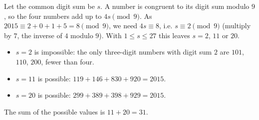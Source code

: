Let the common digit sum be $s$. A number is congruent to its digit sum modulo $9$, so the four numbers add up to $4s\pmod9$. As $2015\equiv2+0+1+5=8\pmod9$, we need $4s\equiv8$, i.e. $s\equiv2\pmod9$ (multiply by $7$, the inverse of $4$ modulo $9$). With $1\le s\le27$ this leaves $s=2$, $11$ or $20$.
\begin{itemize}
\item $s=2$ is impossible: the only three-digit numbers with digit sum $2$ are $101$, $110$, $200$, fewer than four.
\item $s=11$ is possible: $119+146+830+920=2015$.
\item $s=20$ is possible: $299+389+398+929=2015$.
\end{itemize}
The sum of the possible values is $11+20=\boxed{31}$.
